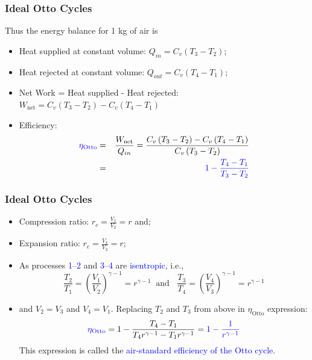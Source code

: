 \documentclass[10pt,compress]{beamer}
\begin{document}
\begin{frame}
 \frametitle{Ideal Otto Cycles}
   Thus the energy balance for 1 kg of air is
  \begin{itemize}
   \item <1-> Heat supplied at constant volume: $Q_{in}=C_{v}\left(T_{3}-T_{2}\right)$;
   \item <2-> Heat rejected at constant volume: $Q_{out}=C_{v}\left(T_{4}-T_{1}\right)$;
   \item <3-> Net Work = Heat supplied - Heat rejected: $W_{\text{net}}=C_{v}\left(T_{3}-T_{2}\right) - C_{v}\left(T_{4}-T_{1}\right)$
   \item <4-> Efficiency:
      \begin{eqnarray}
       \textcolor{blue}{\eta_{\text{Otto}}}&=& \displaystyle\frac{W_{\text{net}}}{Q_{in}}=\displaystyle\frac{C_{v}\left(T_{3}-T_{2}\right) - C_{v}\left(T_{4}-T_{1}\right)}{C_{v}\left(T_{3}-T_{2}\right)} \nonumber \\
                       &=& \textcolor{blue}{1 - \displaystyle\frac{T_{4}-T_{1}}{T_{3}-T_{2}}} \nonumber%
      \end{eqnarray}
  \end{itemize}
\end{frame}

\begin{frame}
 \frametitle{Ideal Otto Cycles}
  \begin{itemize}
   \item <1-> Compression ratio: $r_{c}=\displaystyle\frac{V_{1}}{V_{2}} = r$ and;
   \item <2-> Expansion ratio: $r_{e}=\displaystyle\frac{V_{4}}{V_{3}} = r$;
   \item <3-> As processes \textcolor{blue}{1--2} and \textcolor{blue}{3--4} are \textcolor{blue}{isentropic}, i.e., 
              \begin{displaymath}
               \displaystyle\frac{T_{2}}{T_{1}} = \left( \displaystyle\frac{V_{1}}{V_{2}} \right)^{\gamma - 1} = r^{\gamma - 1} \;\;\text{and }\;\; \displaystyle\frac{T_{3}}{T_{4}} = \left( \displaystyle\frac{V_{4}}{V_{3}} \right)^{\gamma - 1} = r^{\gamma - 1}
              \end{displaymath}
   \item <4-> and $V_{2}=V_{3}$ and $V_{4}=V_{1}$. Replacing $T_{2}$ and $T_{3}$ from above in $\eta_{\text{Otto}}$ expression:
              \begin{displaymath}
                \textcolor{blue}{\eta_{\text{Otto}}} = 1 - \displaystyle\frac{T_{4}-T_{1}}{T_{4} r^{\gamma-1}-T_{1} r^{\gamma-1}} = \textcolor{blue}{1 - \displaystyle\frac{1}{r^{\gamma-1}}}
              \end{displaymath}
     This expression is called the \textcolor{blue}{air-standard efficiency of the Otto cycle}.
  \end{itemize}
\end{frame}
\end{document}
